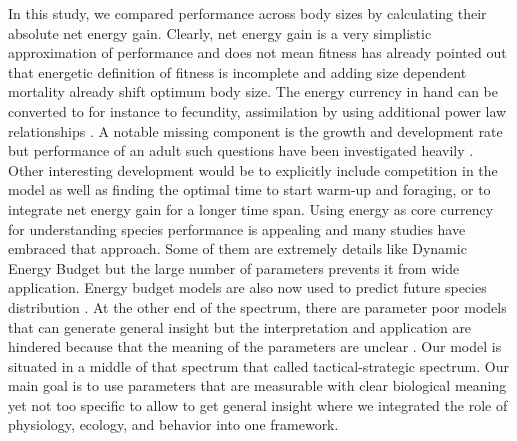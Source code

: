 %
%

In  this study, we compared performance across body sizes by calculating their absolute net energy gain.
Clearly, net energy gain is a very simplistic approximation of performance and does not mean fitness
\citet{Kozlowski1996} has already pointed out that energetic definition of fitness is incomplete and adding size dependent mortality already shift optimum body size.
The energy currency in hand can be converted to for instance to fecundity, assimilation by using additional power law relationships \citep{Kooijman2009}.
A notable missing component is the growth and development rate but performance of an adult such questions have been investigated heavily \citep{VandH1996, Kozlowski2004,Kooijman2009}.
Other interesting development would be to explicitly include competition in the model as well as finding the optimal time to start warm-up and foraging, or to integrate net energy gain for a longer time span.
Using energy as core currency for understanding species performance is appealing and many studies have embraced that approach.
Some of them are extremely details like Dynamic Energy Budget \citep{Kooijman2009} but the large number of parameters prevents it from wide application.
Energy budget models are also now used to predict future species distribution \citep[e.g.,][]{Buckley2008}.
At the other end of the spectrum, there are parameter poor models that can generate general insight but the interpretation and application are hindered because that the meaning of the parameters are unclear \citep[e.g.,][]{Brown1993}.
Our model is situated in a middle of that spectrum that \citet{Holling1966} called tactical-strategic spectrum.
Our main goal is to use parameters that are measurable with clear biological meaning yet not too specific to allow to get general insight where we integrated the role of physiology, ecology, and behavior into one framework.


